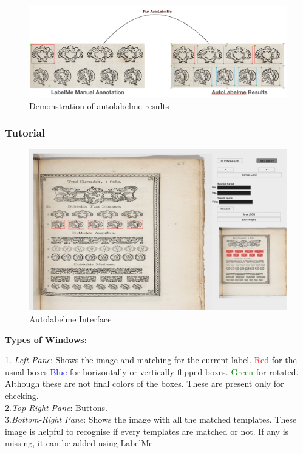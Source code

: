\documentclass[12pt]{article}
\begin{document}
\begin{figure}[h]
    \centering
    \includegraphics[scale=0.28]{Autolabelme results.png}
    \caption{Demonstration of autolabelme results}
    \label{fig:mesh1}
\end{figure}
\subsubsection{Tutorial}
\begin{figure}[h]
    \centering
    \includegraphics[scale=0.2]{View Autolabelme.jpg}
    \caption{Autolabelme Interface}
    \label{fig:mesh2}
\end{figure}
\begin{flushleft}
\textbf{Types of Windows}:\\
\end{flushleft}
1. \textit{Left Pane}: Shows the image and matching for the current label. \textcolor{red}{Red} for the usual boxes.\textcolor{blue}{Blue} for horizontally or vertically flipped boxes. \textcolor{green}{Green} for rotated. Although these are not final colors of the boxes. These are present only for checking.\\
2.\textit{Top-Right Pane}: Buttons.\\
3.\textit{Bottom-Right Pane}: Shows the image with all the matched templates. These image is helpful to recognise if every templates are matched or not. If any is missing, it can be added using LabelMe.\\[2em]
\end{document}
